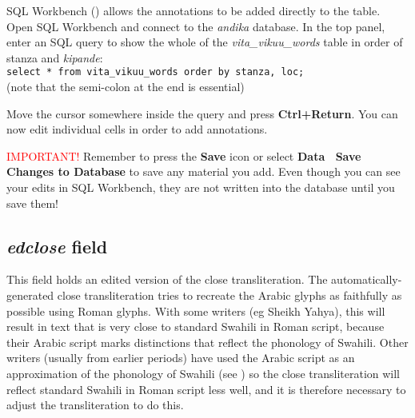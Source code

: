 SQL Workbench () allows the annotations to be added directly to the table.  Open SQL Workbench and connect to the \textit{andika} database.  In the top panel, enter an SQL query to show the whole of the \textit{vita_vikuu_words} table in order of stanza and \textit{kipande}:\\
\verb|select * from vita_vikuu_words order by stanza, loc;|\\
(note that the semi-colon at the end is essential)

Move the cursor somewhere inside the query and press \textbf{Ctrl+Return}.  You can now edit individual cells in order to add annotations.  

\textcolor{red}{IMPORTANT!} Remember to press the \textbf{Save} icon or select \textbf{Data \textrightarrow\ Save Changes to Database} to save any material you add.  Even though you can see your edits in SQL Workbench, they are not written into the database until you save them!

\subsection{\textit{edclose} field}

This field holds an edited version of the close transliteration.  The automatically-generated close transliteration tries to recreate the Arabic glyphs as faithfully as possible using Roman glyphs.  With some writers (eg Sheikh Yahya), this will result in text that is very close to standard Swahili in Roman script, because their Arabic script marks distinctions that reflect the phonology of Swahili.  Other writers (usually from earlier periods) have used the Arabic script as an approximation of the  phonology of Swahili (see ) so the close transliteration will reflect standard Swahili in Roman script less well, and it is therefore necessary to adjust the transliteration to do this.

